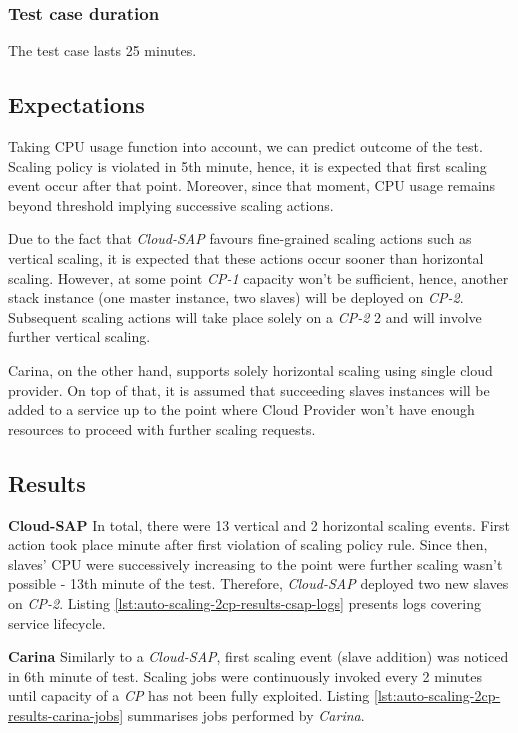 \subsubsection*{Test case duration}
The test case lasts 25 minutes.


\newpage
\subsection*{Expectations}
Taking CPU usage function into account, we can predict outcome of the test. Scaling policy is violated in 5th minute, hence, it is expected that first scaling event occur after that point. Moreover, since that moment, CPU usage remains beyond threshold implying successive scaling actions.

Due to the fact that \emph{Cloud-SAP} favours fine-grained scaling actions such as vertical scaling, it is expected that these actions occur sooner than horizontal scaling. However, at some point \emph{CP-1} capacity won't be sufficient, hence, another stack instance (one master instance, two slaves) will be deployed on \emph{CP-2}. Subsequent scaling actions will take place solely on a \emph{CP-2} 2 and will involve further vertical scaling.

Carina, on the other hand, supports solely horizontal scaling using single cloud provider. On top of that, it is assumed that succeeding slaves instances will be added to a service up to the point where Cloud Provider won't have enough resources to proceed with further scaling requests.

\subsection*{Results}

\begin{asparaenum}
  \item[\textbf{Cloud-SAP}] 
   In total, there were 13 vertical and 2 horizontal scaling events. First action took place minute after first violation of scaling policy rule. Since then, slaves' CPU were successively increasing to the point were further scaling wasn't possible - 13th minute of the test. Therefore, \emph{Cloud-SAP} deployed two new slaves on \emph{CP-2}. Listing \ref{lst:auto-scaling-2cp-results-csap-logs} presents logs covering service lifecycle. 
  
  \item[\textbf{Carina}] 
  Similarly to a \emph{Cloud-SAP}, first scaling event (slave addition) was noticed in 6th minute of test. Scaling jobs were continuously invoked every 2 minutes until capacity of a \emph{CP} has not been fully exploited. Listing \ref{lst:auto-scaling-2cp-results-carina-jobs} summarises jobs performed by \emph{Carina}. 
\end{asparaenum}
  

